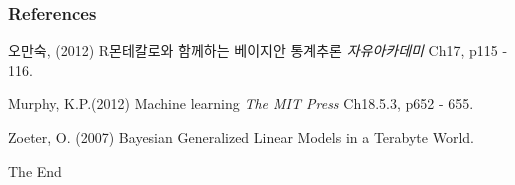 \documentclass{beamer}
\begin{document}

\begin{frame}
\frametitle{References}

\footnotesize{
\begin{thebibliography}{99} %

 오만숙, (2012)
\newblock R몬테칼로와 함께하는 베이지안 통계추론
\newblock \emph{자유아카데미} Ch17, p115 - 116.

 Murphy, K.P.(2012)
\newblock Machine learning
\newblock \emph{The MIT Press} Ch18.5.3, p652 - 655.

 Zoeter, O. (2007)
\newblock Bayesian Generalized Linear Models in a Terabyte World.


\end{thebibliography}
}

\end{frame}


\begin{frame}
\Huge{\centerline{The End}}
\end{frame}


%
%
\end{document}
